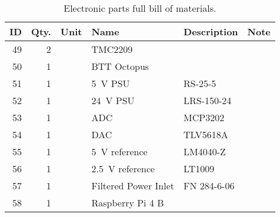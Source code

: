 \newpage
\begin{table}[!ht]
    \centering
    \caption[Electronic parts full bill of materials]{Electronic parts full bill of materials.}%
    \label{tab:electronic bom}
    \begin{tabular}{@{}rrllll@{}}
        \toprule
        ID&	Qty.&	Unit&	Name&	Description&	Note\\
        \midrule
        49& 2& & TMC2209&&\\
        50& 1& & BTT Octopus&&\\
        51& 1& & \qty{5}{\volt} PSU& RS-25-5&\\
        52& 1& & \qty{24}{\volt} PSU& LRS-150-24&\\
        53& 1& & ADC& MCP3202&\\
        54& 1& & DAC& TLV5618A&\\
        55& 1& & \qty{5}{\volt} reference& LM4040-Z&\\
        56& 1& & \qty{2.5}{\volt} reference& LT1009&\\
        57& 1& & Filtered Power Inlet& FN 284-6-06&\\
        58& 1& & Raspberry Pi 4 B&&\\
        \bottomrule
    \end{tabular}
\end{table}